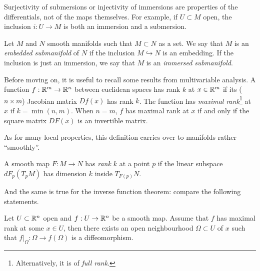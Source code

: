 \begin{remark}
  Surjectivity of submersions or injectivity of immersions are properties of the differentials, not of the maps themselves.
  For example, if $U\subset M$ open, the inclusion $i: U \to M$ is both an immersion and a submersion.
\end{remark}

\begin{definition}
  Let $M$ and $N$ smooth manifolds such that $M\subset N$ as a set.
  We say that $M$ is an \emph{embedded submanifold} of $N$ if the inclusion $M\hookrightarrow N$ is an embedding. If the inclusion is just an immersion, we say that $M$ is an \emph{immersed submanifold}.
\end{definition}

Before moving on, it is useful to recall some results from multivariable analysis.
A function $f:\mathbb{R}^m \to \mathbb{R}^n$ between euclidean spaces has rank $k$ at $x\in\mathbb{R}^m$ if its ($n\times m$) Jacobian matrix $Df(x)$ has rank $k$.
The function has \emph{maximal rank}\footnote{Alternatively, it is of \emph{full rank}.} at $x$ if $k = \min(n,m)$.
When $n=m$, $f$ has maximal rank at $x$ if and only if the square matrix $DF(x)$ is an invertible matrix.

As for many local properties, this definition carries over to manifolds rather ``smoothly''.

\begin{definition}
  A smooth map $F:M\to N$ has \emph{rank $k$} at a point $p$ if the linear subspace $dF_p(T_pM)$ has dimension $k$ inside $T_{F(p)}N$.
\end{definition}

And the same is true for the inverse function theorem:
compare the following statements.

\begin{theorem}\label{thm:ift}
  Let $U\subset\mathbb{R}^n$ open and $f:U \to \mathbb{R}^n$ be a smooth map.
  Assume that $f$ has maximal rank at some $x\in U$, then there exists an open neighbourhood $\Omega\subset U$ of $x$ such that  $f\big|_\Omega : \Omega \to f(\Omega)$ is a diffeomorphism.
\end{theorem}

